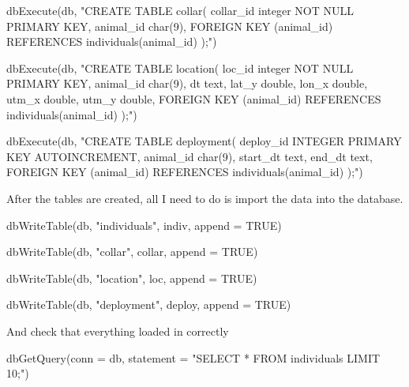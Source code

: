 \documentclass[
]{book}
\newenvironment{Shaded}{\begin{snugshade}}{\end{snugshade}}
\newcommand{\AttributeTok}[1]{\textcolor[rgb]{0.77,0.63,0.00}{#1}}
\newcommand{\ConstantTok}[1]{\textcolor[rgb]{0.00,0.00,0.00}{#1}}
\newcommand{\FunctionTok}[1]{\textcolor[rgb]{0.00,0.00,0.00}{#1}}
\newcommand{\NormalTok}[1]{#1}
\newcommand{\StringTok}[1]{\textcolor[rgb]{0.31,0.60,0.02}{#1}}
\begin{document}
\begin{Shaded}
\begin{Highlighting}[]
\FunctionTok{dbExecute}\NormalTok{(db, }
  \StringTok{"CREATE TABLE collar(}
\StringTok{  collar\_id integer NOT NULL PRIMARY KEY,}
\StringTok{  animal\_id char(9), }
\StringTok{  FOREIGN KEY (animal\_id) REFERENCES individuals(animal\_id)}
\StringTok{  );"}\NormalTok{)}

\FunctionTok{dbExecute}\NormalTok{(db, }
  \StringTok{"CREATE TABLE location(}
\StringTok{  loc\_id integer NOT NULL PRIMARY KEY,}
\StringTok{  animal\_id char(9),}
\StringTok{  dt text,}
\StringTok{  lat\_y double, }
\StringTok{  lon\_x double,}
\StringTok{  utm\_x double,}
\StringTok{  utm\_y double,}
\StringTok{  FOREIGN KEY (animal\_id) REFERENCES individuals(animal\_id)}
\StringTok{  );"}\NormalTok{)}

\FunctionTok{dbExecute}\NormalTok{(db, }
  \StringTok{"CREATE TABLE deployment(}
\StringTok{  deploy\_id INTEGER PRIMARY KEY AUTOINCREMENT,}
\StringTok{  animal\_id char(9),}
\StringTok{  start\_dt text,}
\StringTok{  end\_dt text,}
\StringTok{  FOREIGN KEY (animal\_id) REFERENCES individuals(animal\_id)}
\StringTok{  );"}\NormalTok{)}
\end{Highlighting}
\end{Shaded}

After the tables are created, all I need to do is import the data into the database.

\begin{Shaded}
\begin{Highlighting}[]
\FunctionTok{dbWriteTable}\NormalTok{(db, }\StringTok{"individuals"}\NormalTok{, indiv, }\AttributeTok{append =} \ConstantTok{TRUE}\NormalTok{)}

\FunctionTok{dbWriteTable}\NormalTok{(db, }\StringTok{"collar"}\NormalTok{, collar, }\AttributeTok{append =} \ConstantTok{TRUE}\NormalTok{)}

\FunctionTok{dbWriteTable}\NormalTok{(db, }\StringTok{"location"}\NormalTok{, loc, }\AttributeTok{append =} \ConstantTok{TRUE}\NormalTok{)}

\FunctionTok{dbWriteTable}\NormalTok{(db, }\StringTok{"deployment"}\NormalTok{, deploy, }\AttributeTok{append =} \ConstantTok{TRUE}\NormalTok{)}
\end{Highlighting}
\end{Shaded}

And check that everything loaded in correctly

\begin{Shaded}
\begin{Highlighting}[]
\FunctionTok{dbGetQuery}\NormalTok{(}\AttributeTok{conn =}\NormalTok{ db, }\AttributeTok{statement =} \StringTok{"SELECT * FROM individuals LIMIT 10;"}\NormalTok{)}
\end{Highlighting}
\end{Shaded}
\end{document}
